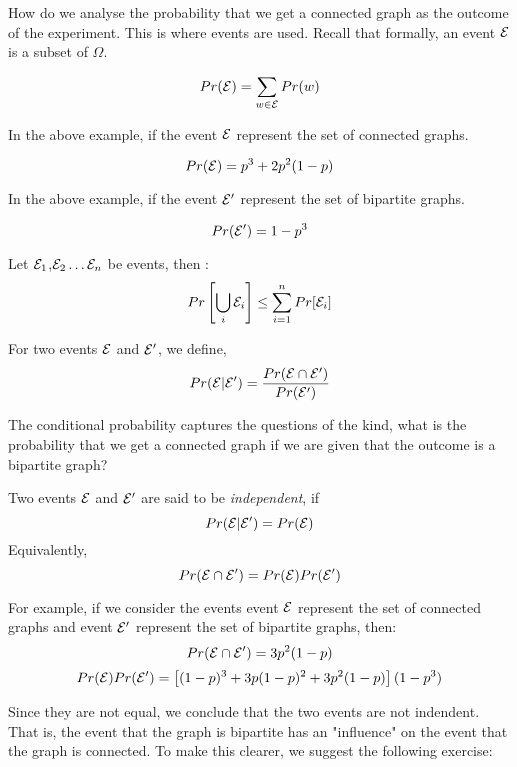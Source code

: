 How do we analyse the probability that we get a connected graph as the outcome of the experiment. This is where events are used. Recall that formally, an event $\cal{E}$ is a subset of $\Omega$.

$$Pr({\cal{E}}) = \sum_{w \in {\cal{E}}} Pr(w)$$

\noindent In the above example, if the event ${\cal{E}}$ represent the set of connected graphs.

$$Pr({\cal{E}}) = p^3+2p^2(1-p)$$

\noindent In the above example, if the event ${\cal{E}'}$ represent the set of bipartite graphs.

$$Pr({\cal{E}'}) = 1-p^3$$

\begin{proposition}
Let ${\cal{E}}_1$,${\cal{E}}_2 \ldots {\cal{E}}_n$ be events, then :
$$Pr\left[\bigcup_{i} {\cal{E}}_i\right] \le \sum_{i=1}^n Pr[{\cal{E}}_i]$$
\end{proposition}

\begin{definition}
For two events ${\cal{E}}$ and ${\cal{E}'}$, we define, 
$$Pr({\cal{E}}|{\cal{E}'}) = \frac{Pr({\cal{E}}\cap{\cal{E}'})}{Pr({\cal{E}'})}$$
\end{definition}

\noindent The conditional probability captures the questions of the kind, what is the probability that we get a connected graph if we are given that the outcome is a bipartite graph? 

\begin{definition}
Two events ${\cal{E}}$ and ${\cal{E}'}$ are said to be \textit{independent}, if 
$$Pr({\cal{E}}|{\cal{E}'}) = Pr({\cal{E}})$$
Equivalently,
$$Pr({\cal{E}} \cap {\cal{E}'}) = Pr({\cal{E}})Pr({\cal{E}}')$$
\end{definition}

For example, if we consider the events event ${\cal{E}}$ represent the set of connected graphs and event ${\cal{E}'}$ represent the set of bipartite graphs, then:
$$Pr({\cal{E}} \cap {\cal{E}'}) = 3p^2(1-p)$$
$$Pr({\cal{E}})Pr({\cal{E}'}) = \left[(1-p)^3+3p(1-p)^2+3p^2(1-p)\right](1-p^3)$$

Since they are not equal, we conclude that the two events are not indendent. That is, the event that the graph is bipartite has an "influence" on the event that the graph is connected. To make this clearer, we suggest the following exercise:

